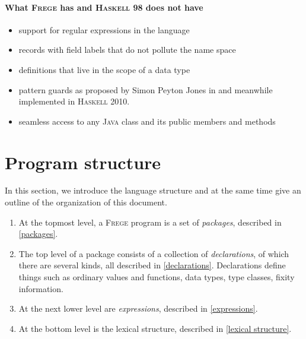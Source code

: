 \documentclass[a4paper,landscape,twocolumn]{report}
\newcommand{\haskell}[0]{\textsc{Haskell}}
\newcommand{\frege}[0]{\textsc{Frege}}
\newcommand{\java}[0]{\textsc{Java}}
\begin{document}

\paragraph{What \frege{} has and \haskell{} 98 does not have}
\begin{itemize}
\item support for regular expressions in the language
\item records with field labels that do not pollute the name space
\item definitions that live in the scope of a data type
\item pattern guards as proposed by Simon Peyton Jones in \cite{pguards}
and meanwhile implemented in \haskell{} 2010.
\item seamless access to any \java{} class and its public members and methods
\end{itemize}

\section{Program structure}

In this section, we introduce the language structure and at the
same time give an outline of the organization of this
document.

\begin{enumerate}

\item At the topmost level, a \frege{} program is a set of
\emph{packages}, described in \autoref{packages}.

\item The top level of a package consists of a collection of
\emph{declarations},
of which there are several kinds, all described in
\autoref{declarations}.
Declarations define things such as ordinary values and functions,
data types,
type classes, fixity information.

\item At the next lower level are \emph{expressions}, described in
\autoref{expressions}.

\item At the bottom level is the lexical structure, described in
\autoref{lexical structure}.

\end{enumerate}
\end{document}
